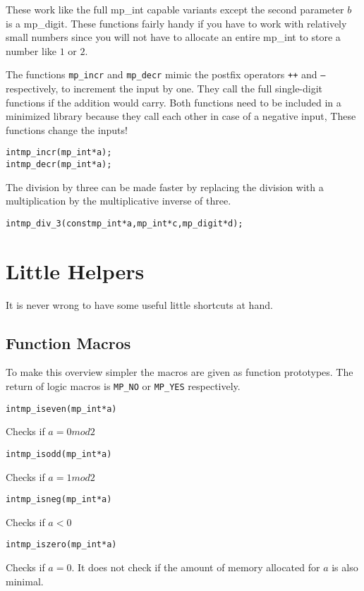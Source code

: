 \documentclass[synpaper]{book}
\begin{document}
These work like the full mp\_int capable variants except the second parameter $b$ is a mp\_digit.  These
functions fairly handy if you have to work with relatively small numbers since you will not have to allocate
an entire mp\_int to store a number like $1$ or $2$.

The functions \texttt{mp\_incr} and \texttt{mp\_decr} mimic the postfix operators \texttt{++} and \texttt{--} respectively, to increment the input by one. They call the full single-digit functions if the addition would carry. Both functions need to be included in a minimized library because they call each other in case of a negative input, These functions change the inputs!
\begin{alltt}
int mp_incr(mp_int *a);
int mp_decr(mp_int *a);
\end{alltt}


The division by three can be made faster by replacing the division with a multiplication by the multiplicative inverse of three.

\begin{alltt}
int mp_div_3(const mp_int *a, mp_int *c, mp_digit *d);
\end{alltt}

\chapter{Little Helpers}
It is never wrong to have some useful little shortcuts at hand.
\section{Function Macros}
To make this overview simpler the macros are given as function prototypes. The return of logic macros is \texttt{MP\_NO} or \texttt{MP\_YES} respectively.

\begin{alltt}
int mp_iseven(mp_int *a)
\end{alltt}
Checks if $a = 0 mod 2$

\begin{alltt}
int mp_isodd(mp_int *a)
\end{alltt}
Checks if $a = 1 mod 2$

\begin{alltt}
int mp_isneg(mp_int *a)
\end{alltt}
Checks if $a < 0$


\begin{alltt}
int mp_iszero(mp_int *a)
\end{alltt}
Checks if $a = 0$. It does not check if the amount of memory allocated for $a$ is also minimal.
\end{document}
